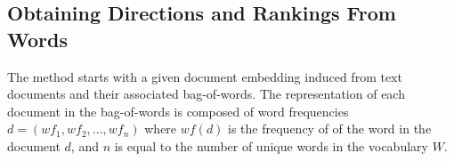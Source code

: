 


\subsection{Obtaining Directions and Rankings From Words}\label{ch3:LearningInterpretableDirections}

The method starts with a given document embedding induced from text documents and their associated bag-of-words. The representation of  each document in the bag-of-words is composed of word frequencies $d = ({wf}_1, {wf}_2, ..., {wf}_n)$ where ${wf}(d)$ is the frequency of of the word in the document $d$, and $n$ is equal to the number of unique words  in the vocabulary $ W$.


